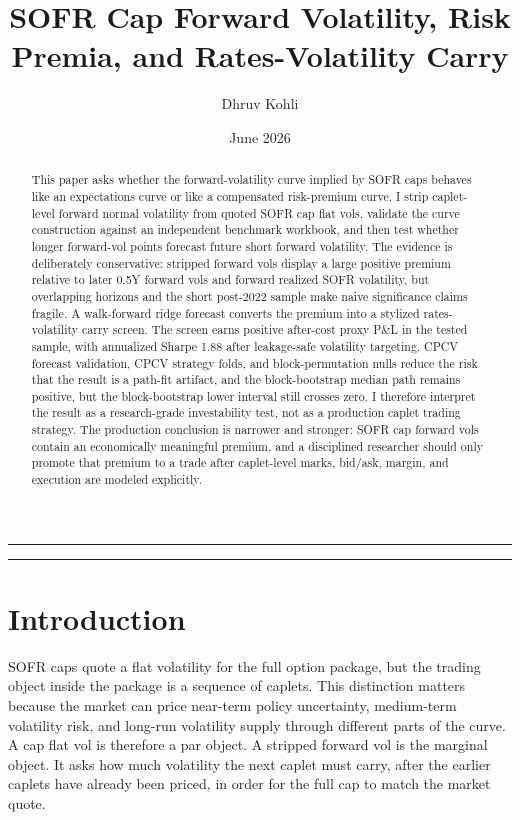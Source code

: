 \documentclass[12pt]{article}
\title{\vspace{-0.6cm}SOFR Cap Forward Volatility, Risk Premia, and Rates-Volatility Carry}
\author{Dhruv Kohli}
\date{June 2026}
\begin{document}
\maketitle
\vspace{-0.4cm}
\noindent\rule{\textwidth}{0.4pt}

\begin{abstract}
This paper asks whether the forward-volatility curve implied by SOFR caps behaves like an
expectations curve or like a compensated risk-premium curve. I strip caplet-level forward
normal volatility from quoted SOFR cap flat vols, validate the curve construction against an
independent benchmark workbook, and then test whether longer forward-vol points forecast future short
forward volatility. The evidence is deliberately conservative: stripped forward vols display a
large positive premium relative to later 0.5Y forward vols and forward realized SOFR
volatility, but overlapping horizons and the short post-2022 sample make naive significance
claims fragile. A walk-forward ridge forecast converts the premium into a stylized
rates-volatility carry screen. The screen earns positive after-cost proxy P\&L in the tested
sample, with annualized Sharpe 1.88 after leakage-safe volatility targeting. CPCV forecast
validation, CPCV strategy folds, and block-permutation nulls reduce the risk that the
result is a path-fit artifact, and the block-bootstrap median path remains positive, but the
block-bootstrap lower interval still crosses zero. I therefore
interpret the result as a research-grade investability test, not as a production caplet trading
strategy. The production conclusion is narrower and stronger: SOFR cap
forward vols contain an economically meaningful premium, and a disciplined researcher should
only promote that premium to a trade after caplet-level marks, bid/ask, margin, and execution
are modeled explicitly.
\end{abstract}

\noindent\rule{\textwidth}{0.4pt}

\section{Introduction}

SOFR caps quote a flat volatility for the full option package, but the trading object inside the
package is a sequence of caplets. This distinction matters because the market can price near-term
policy uncertainty, medium-term volatility risk, and long-run volatility supply through different
parts of the curve. A cap flat vol is therefore a par object. A stripped forward vol is the marginal
object. It asks how much volatility the next caplet must carry, after the earlier caplets have already
been priced, in order for the full cap to match the market quote.
\end{document}
